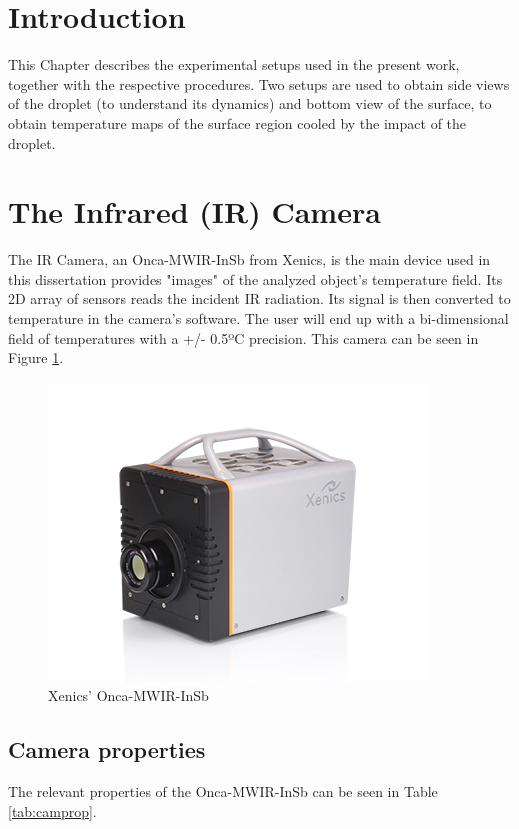 \section{Introduction}

\par This Chapter describes the experimental setups used in the present work, together with the respective procedures. Two setups are used to obtain side views of the droplet (to understand its dynamics) and bottom view of the surface, to obtain temperature maps of the surface region cooled by the impact of the droplet.\\

\section{The Infrared (IR) Camera}
\label{sec:icam}
The IR Camera, an Onca-MWIR-InSb from Xenics, is the main device used in this dissertation provides "images" of the analyzed object's temperature field. Its 2D array of sensors reads the incident IR radiation. Its signal is then converted to temperature in the camera's software. The user will end up with a bi-dimensional field of temperatures with a +/- 0.5ºC precision. This camera can be seen in Figure \ref{fig:onca}.

\begin{figure}[h!]
\centering
\includegraphics[width=0.6\linewidth]{Figures/2.Chapter/onca.png}
\caption{Xenics' Onca-MWIR-InSb}
\label{fig:onca}
\end{figure}

\subsection{Camera properties}

\par The relevant properties of the Onca-MWIR-InSb can be seen in Table \ref{tab:camprop}.

